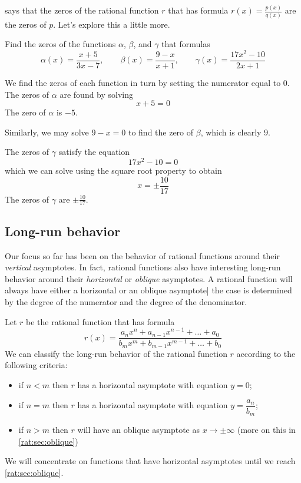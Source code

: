  says that the zeros of 
the rational function $r$ that has formula $r(x)=\frac{p(x)}{q(x)}$ are 
the zeros of $p$. Let's explore this a little more.
\begin{pccexample}[Zeros] 
	Find the zeros of the functions $\alpha$, $\beta$, and $\gamma$ that
	formulas
	\[
		\alpha(x)=\frac{x+5}{3x-7}, \qquad \beta(x)=\frac{9-x}{x+1}, \qquad \gamma(x)=\frac{17x^2-10}{2x+1}
	\]
	\begin{pccsolution}
		We find the zeros of each function in turn by setting the numerator equal to $0$. The zeros of 
		$\alpha$ are found by solving 
		\[
			x+5=0
		\]
		The zero of $\alpha$ is $-5$.
		
		Similarly, we may solve $9-x=0$ to find the zero of $\beta$, which is clearly $9$.
		
		The zeros of $\gamma$ satisfy the equation
		\[
			17x^2-10=0
		\]
		which we can solve using the square root property to obtain
		\[
			x=\pm\frac{10}{17}
		\]
		The zeros of $\gamma$ are $\pm\frac{10}{17}$.
	\end{pccsolution}
\end{pccexample}

\subsection*{Long-run behavior}
Our focus so far has been on the behavior of rational functions around 
their \emph{vertical} asymptotes. In fact, rational functions also 
have interesting long-run behavior around their \emph{horizontal} or 
\emph{oblique} asymptotes. A rational function will always have either 
a horizontal or an oblique asymptote| the case is determined by the degree
of the numerator and the degree of the denominator.
\begin{pccdefinition}\label{rat:def:longrun}
	Let $r$ be the rational function that has formula
	\[
		r(x) = \frac{a_n x^n + a_{n-1}x^{n-1}+\ldots + a_0}{b_m x^m + b_{m-1}x^{m-1}+\ldots+b_0}
	\]
	We can classify the long-run behavior of the rational function $r$ 
	according to the following criteria:
	\begin{itemize}
		\item if $n<m$ then  $r$ has a horizontal asymptote with equation $y=0$;
		\item if $n=m$ then $r$ has a horizontal asymptote with equation $y=\dfrac{a_n}{b_m}$;
		\item if $n>m$ then $r$ will have an oblique asymptote as $x\rightarrow\pm\infty$ (more on this in \cref{rat:sec:oblique})
	\end{itemize} 
\end{pccdefinition}
We will concentrate on functions that have horizontal asymptotes until 
we reach \cref{rat:sec:oblique}.

